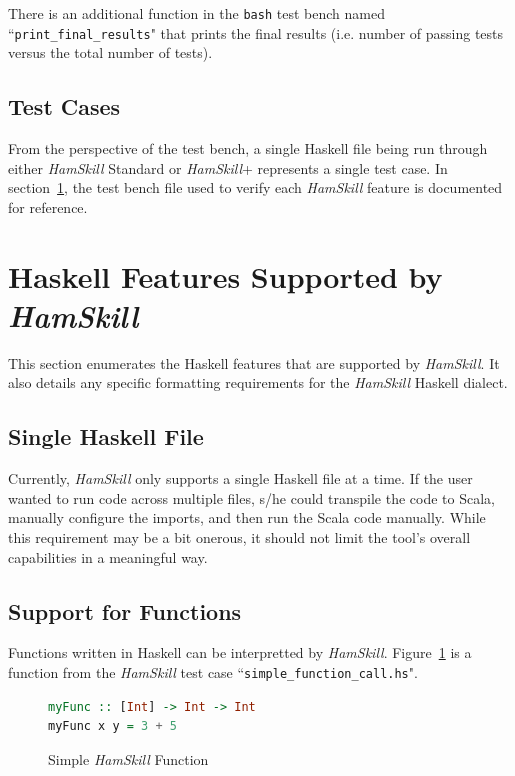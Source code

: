 \documentclass{report}
\begin{document}
There is an additional function in the \texttt{bash} test bench named ``\texttt{print\_final\_results}" that prints the final results (i.e. number of passing tests versus the total number of tests).

\subsection{Test Cases}

From the perspective of the test bench, a single Haskell file being run through either \textit{HamSkill} Standard or \textit{HamSkill}+ represents a single test case.  In section~\ref{sec:hamskillFeatures}, the test bench file used to verify each \textit{HamSkill} feature is documented for reference.

\section{Haskell Features Supported by \textit{HamSkill}}\label{sec:hamskillFeatures}

This section enumerates the Haskell features that are supported by \textit{HamSkill}.  It also details any specific formatting requirements for the \textit{HamSkill} Haskell dialect.

\subsection{Single Haskell File}

Currently, \textit{HamSkill} only supports a single Haskell file at a time.  If the user wanted to run code across multiple files, s/he could transpile the code to Scala, manually configure the imports, and then run the Scala code manually.  While this requirement may be a bit onerous, it should not limit the tool's overall capabilities in a meaningful way.

\subsection{Support for Functions}

Functions written in Haskell can be interpretted by \textit{HamSkill}.  Figure~\ref{fig:myFunctionHaskell} is a function from the \textit{HamSkill} test case ``\texttt{simple\_function\_call.hs}".

\begin{figure}[H]
\begin{mdframed}
\begin{lstlisting}[language=Haskell]
myFunc :: [Int] -> Int -> Int
myFunc x y = 3 + 5
\end{lstlisting}
\end{mdframed}
\caption{Simple \textit{HamSkill} Function}\label{fig:myFunctionHaskell}
\end{figure}
\end{document}
